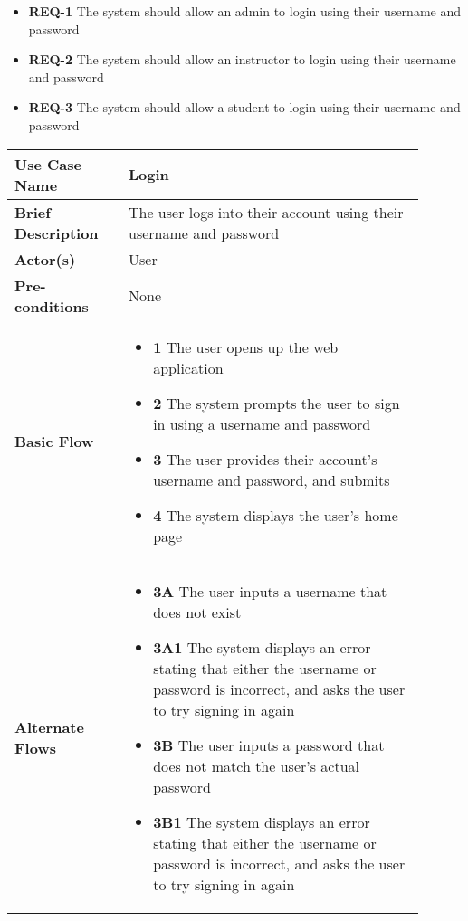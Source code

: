 \documentclass{article}
\begin{document}

\begin{itemize}
  \item \textbf{REQ-1} The system should allow an admin to login using their username and password
  \item \textbf{REQ-2} The system should allow an instructor to login using their username and password
  \item \textbf{REQ-3} The system should allow a student to login using their username and password
\end{itemize}


\vspace{0.1in}

\begin{tabular}{| p{0.25\linewidth} | p{0.65\linewidth} |}
  \hline
  \textbf{Use Case Name} & Login \\
  \hline
  \textbf{Brief Description} & The user logs into their account using their username and password \\
  \hline
  \textbf{Actor(s)} & User \\
  \hline
  \textbf{Pre-conditions} & None\\
  \hline
  \textbf{Basic Flow} & \begin{itemize}
    \item[] \textbf{1} The user opens up the web application
    \item[] \textbf{2} The system prompts the user to sign in using a username and password
    \item[] \textbf{3} The user provides their account's username and password, and submits
    \item[] \textbf{4} The system displays the user's home page
  \end{itemize}\\
  \hline
  \textbf{Alternate Flows} & \begin{itemize}
    \item[] \textbf{3A} The user inputs a username that does not exist
    \item[] \textbf{3A1} The system displays an error stating that either the username or password is incorrect, and asks the user to try signing in again
    \item[] \textbf{3B} The user inputs a password that does not match the user's actual password
    \item[] \textbf{3B1} The system displays an error stating that either the username or password is incorrect, and asks the user to try signing in again
  \end{itemize} \\
  \hline
\end{tabular}
\end{document}
